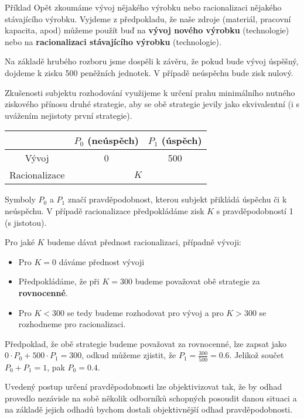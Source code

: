 	\begin{note}{Příklad}
	Opět zkoumáme vývoj nějakého výrobku nebo racionalizaci nějakého stávajícího výrobku. Vyjdeme z předpokladu, že naše zdroje (materiál, pracovní kapacita, apod) můžeme použít buď na \textbf{vývoj nového výrobku} (technologie) nebo na \textbf{racionalizaci stávajícího výrobku} (technologie).\br
	
	Na základě hrubého rozboru jsme dospěli k závěru, že pokud bude vývoj úspěšný, dojdeme k zisku 500 peněžních jednotek. V případě neúspěchu bude zisk nulový.\br
	
	Zkušenosti subjektu rozhodování využijeme k určení prahu minimálního nutného ziskového přínosu druhé strategie, aby se obě strategie jevily jako ekvivalentní (i s uvážením nejistoty první strategie).
	
	\begin{table}[H]
	\centering
	\def\arraystretch{1.25}
	\begin{tabular}{|c|c|c|}
	\hline
	& $P_0$ (neúspěch) & $P_1$ (úspěch)\\\hline
	Vývoj & 0 & 500\\\hline
	Racionalizace & \multicolumn{2}{|c|}{$K$}\\\hline
	\end{tabular}
	\end{table}		
	
	Symboly $P_0$ a $P_1$ značí pravděpodobnost, kterou subjekt přikládá úspěchu či k neúspěchu. V případě racionalizace předpokládáme zisk $K$ s pravděpodobností 1 (s jistotou).\br
	
	Pro jaké $K$ budeme dávat přednost racionalizaci, případně vývoji:
	\begin{itemize}[noitemsep]
		\item Pro $K=0$ dáváme přednost vývoji
		\item Předpokládáme, že při $K=300$ budeme považovat obě strategie za \textbf{rovnocenné}.
		\item Pro $K < 300$ se tedy budeme rozhodovat pro vývoj a pro $K>300$ se rozhodneme pro racionalizaci.
	\end{itemize}
	
	Předpoklad, že obě strategie budeme považovat za rovnocenné, lze zapsat jako $0\cdot P_0 + 500\cdot P_1=300$, odkud můžeme zjistit, že $P_1 = \frac{300}{500} = 0.6$. Jelikož součet $P_0+P_1=1$, pak $P_0=0.4$.\br
	
	Uvedený postup určení pravděpodobnosti lze objektivizovat tak, že by odhad provedlo nezávisle na sobě několik odborníků schopných posoudit danou situaci a na základě jejich odhadů bychom dostali objektivnější odhad pravděpodobnosti.
	\end{note}
	
